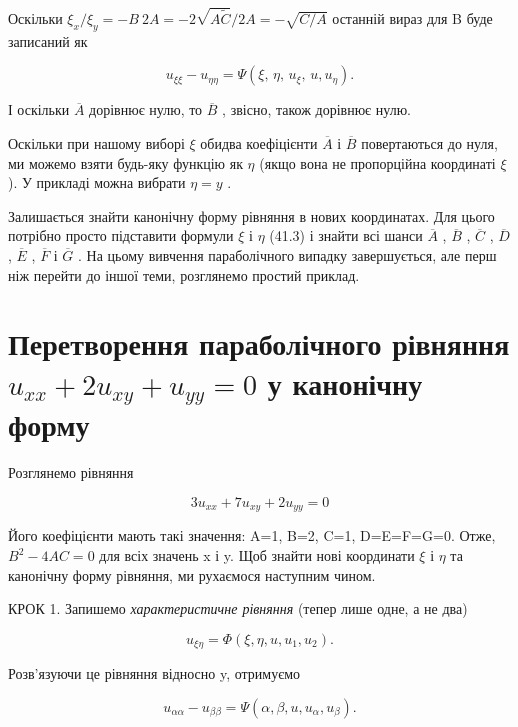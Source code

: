 \documentclass[
  ukrainian,
]{article}
\begin{document}
Оскільки
\(\xi_x/\xi_y = -B \ 2A = -2 \sqrt{A\tilde{C}}/2A = -\sqrt{C/A}\)
останній вираз для B буде записаний як

\[
u_{\xi\xi} - u_{\eta\eta} = \Psi(\xi, \, \eta, \, u_{\xi}, \, u, u_{\eta}).
\]

І оскільки \(\overline{A}\) дорівнює нулю, то \(\overline{B}\) , звісно,
також дорівнює нулю.

Оскільки при нашому виборі \(\xi\) обидва коефіцієнти \(\overline{A}\) і
\(\overline{B}\) повертаються до нуля, ми можемо взяти будь-яку функцію
як \(\eta\) (якщо вона не пропорційна координаті \(\xi\) ). У прикладі
можна вибрати \(\eta = y\) .

Залишається знайти канонічну форму рівняння в нових координатах. Для
цього потрібно просто підставити формули \(\xi\) і \(\eta\) (41.3) і
знайти всі шанси \(\overline{A}\) , \(\overline{B}\) , \(\overline{C}\)
, \(\overline{D}\) , \(\overline{E}\) , \(\overline{F}\) і
\(\overline{G}\) . На цьому вивчення параболічного випадку завершується,
але перш ніж перейти до іншої теми, розглянемо простий приклад.

\section{\texorpdfstring{Перетворення параболічного рівняння
\(u_{xx} + 2u_{xy} + u_{yy} = 0\) у канонічну
форму}{Перетворення параболічного рівняння u\_\{xx\} + 2u\_\{xy\} + u\_\{yy\} = 0 у канонічну форму}}\label{ux43fux435ux440ux435ux442ux432ux43eux440ux435ux43dux43dux44f-ux43fux430ux440ux430ux431ux43eux43bux456ux447ux43dux43eux433ux43e-ux440ux456ux432ux43dux44fux43dux43dux44f-u_xx-2u_xy-u_yy-0-ux443-ux43aux430ux43dux43eux43dux456ux447ux43dux443-ux444ux43eux440ux43cux443}

Розглянемо рівняння

\[
3u_{xx} + 7u_{xy} + 2u_{yy} = 0
\]

Його коефіцієнти мають такі значення: A=1, B=2, C=1, D=E=F=G=0. Отже,
\(B^2-4AC=0\) для всіх значень x і y. Щоб знайти нові координати \(\xi\)
і \(\eta\) та канонічну форму рівняння, ми рухаємося наступним чином.

КРОК 1. Запишемо \emph{характеристичне рівняння} (тепер лише одне, а не
два)

\[
u_{\xi\eta} = \Phi(\xi, \eta, u, u_1, u_2).
\]

Розв'язуючи це рівняння відносно y, отримуємо

\[
u_{\alpha\alpha} - u_{\beta\beta} = \Psi(\alpha, \beta, u, u_{\alpha}, u_{\beta}).
\]
\end{document}
